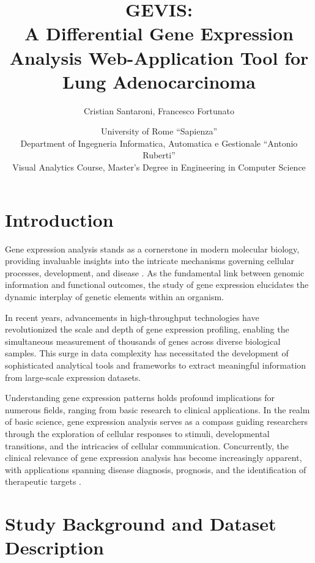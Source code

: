 \documentclass[
	a4paper, %
	10pt, %
	unnumberedsections, %
	twoside, %
]{LTJournalArticle}
\title{GEVIS: \\A Differential Gene Expression Analysis Web-Application Tool for Lung Adenocarcinoma
} %
\author{%
	Cristian Santaroni, Francesco Fortunato 
}
\date{\footnotesize University of Rome ``Sapienza''\\ Department of Ingegneria Informatica, Automatica e Gestionale ``Antonio Ruberti''\\ Visual Analytics Course, Master's Degree in Engineering in Computer Science}
\begin{document}
\maketitle %


\section{Introduction}

Gene expression analysis stands as a cornerstone in modern molecular biology, providing invaluable insights into the intricate mechanisms governing cellular processes, development, and disease \cite{rosati2024differential}. As the fundamental link between genomic information and functional outcomes, the study of gene expression elucidates the dynamic interplay of genetic elements within an organism.

In recent years, advancements in high-throughput technologies have revolutionized the scale and depth of gene expression profiling, enabling the simultaneous measurement of thousands of genes across diverse biological samples. This surge in data complexity has necessitated the development of sophisticated analytical tools and frameworks to extract meaningful information from large-scale expression datasets. 

Understanding gene expression patterns holds profound implications for numerous fields, ranging from basic research to clinical applications. In the realm of basic science, gene expression analysis serves as a compass guiding researchers through the exploration of cellular responses to stimuli, developmental transitions, and the intricacies of cellular communication. Concurrently, the clinical relevance of gene expression analysis has become increasingly apparent, with applications spanning disease diagnosis, prognosis, and the identification of therapeutic targets \cite{rosati2024differential}.


\section{Study Background and Dataset Description}
\end{document}
